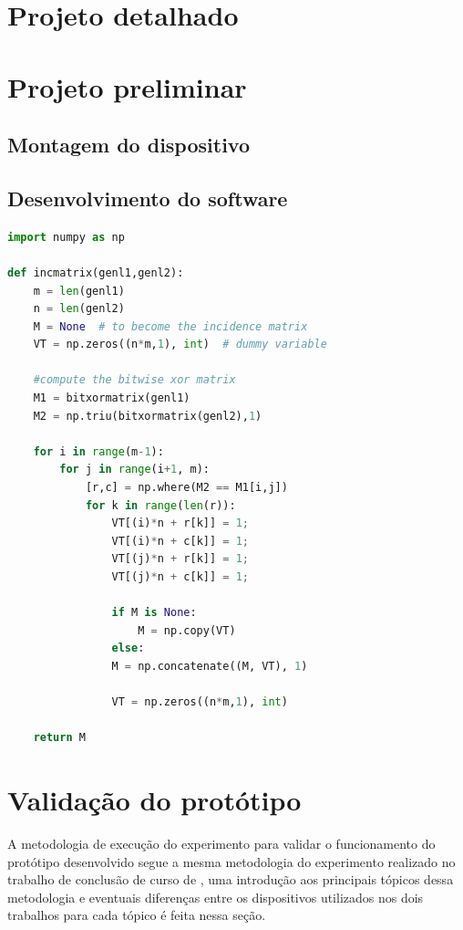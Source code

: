 \section{Projeto detalhado}




\section{Projeto preliminar}

\subsection[]{Montagem do dispositivo}

\subsection[]{Desenvolvimento do software}

\begin{lstlisting}[language=Python,caption={[Python example]{Python example -- \showfont}}]
import numpy as np

def incmatrix(genl1,genl2):
    m = len(genl1)
    n = len(genl2)
    M = None  # to become the incidence matrix
    VT = np.zeros((n*m,1), int)  # dummy variable

    #compute the bitwise xor matrix
    M1 = bitxormatrix(genl1)
    M2 = np.triu(bitxormatrix(genl2),1)

    for i in range(m-1):
        for j in range(i+1, m):
            [r,c] = np.where(M2 == M1[i,j])
            for k in range(len(r)):
                VT[(i)*n + r[k]] = 1;
                VT[(i)*n + c[k]] = 1;
                VT[(j)*n + r[k]] = 1;
                VT[(j)*n + c[k]] = 1;

                if M is None:
                    M = np.copy(VT)
                else:
                M = np.concatenate((M, VT), 1)

                VT = np.zeros((n*m,1), int)

    return M
\end{lstlisting}

\section{Validação do protótipo}

A metodologia de execução do experimento para validar o funcionamento do protótipo desenvolvido segue a mesma metodologia do experimento realizado no trabalho de conclusão
de curso de \autocite{Minela2017}, uma introdução aos principais tópicos dessa metodologia e eventuais diferenças entre os dispositivos utilizados nos dois trabalhos para cada tópico é feita nessa seção.

